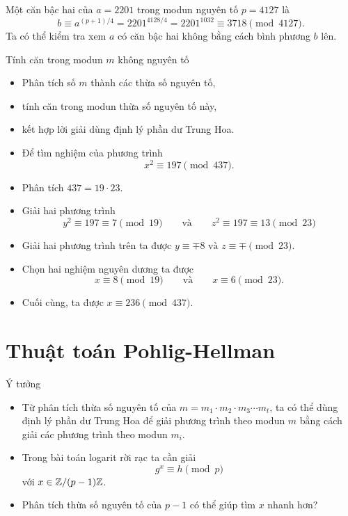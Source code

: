 \begin{frame}
	\begin{xmpl}
		Một căn bậc hai của $a=2201$ trong modun nguyên tố $p = 4127$ là
		\[
			b \equiv a^{(p+1)/4} = 2201^{4128/4} = 2201^{1032} \equiv 3718 \pmod{4127}. 
		\]
		Ta có thể kiểm tra xem $a$ có căn bậc hai không bằng cách bình phương $b$ lên.
	\end{xmpl}
\end{frame}
\begin{frame}{Tính căn trong modun $m$ không nguyên tố}
	\begin{itemize}
		\item<+-> Phân tích số $m$ thành các thừa số nguyên tố,
		\item<+-> tính căn trong modun thừa số nguyên tố này,  
		\item<+-> kết hợp lời giải dùng định lý phần dư Trung Hoa. 
	\end{itemize}
\end{frame}

\begin{frame}
	\begin{xmpl}
		\begin{itemize}
			\item Để  tìm nghiệm của phương trình 
			\[
				x^2 \equiv 197 \pmod{437}.
				\]
			\item Phân tích $437 = 19 \cdot 23$.
			\item<+-> Giải hai phương trình 
			\[
				y^2 \equiv 197 \equiv 7 \pmod{19}\qquad \text{và}\qquad z^2 \equiv 197 \equiv 13 \pmod{23}  
			\] 
			\item<+-> Giải hai phương trình trên ta được $y \equiv \mp 8 \text{ và } z \equiv \mp \pmod{23}.$			 
			\item<+-> Chọn hai nghiệm nguyên dương ta được 
			\[
				x \equiv 8 \pmod{19} \qquad \text{và} \qquad x \equiv 6 \pmod{23}.
			\] 
			\item<+-> Cuối cùng, ta được $x \equiv 236 \pmod{437}$. 
		\end{itemize}
	\end{xmpl}
\end{frame}

\section{Thuật toán Pohlig-Hellman}
\begin{frame}{Ý  tưởng}
	\begin{itemize}
		\item<+-> Từ phân tích thừa số  nguyên tố của $m = m_1 \cdot m_2 \cdot m_3 \cdots m_t$, ta có thể dùng định lý phần dư Trung Hoa để giải phương trình theo modun $m$ bằng cách giải các phương trình theo modun $m_i$. 
		\item<+-> Trong bài toán logarit rời rạc ta cần giải
		\[
			g^x \equiv h \pmod{p}
		\] 
		với $x \in \mathbb{Z}/(p-1)\mathbb{Z}$.
		\item<+-> Phân tích thừa số nguyên tố của $p-1$ có thể giúp tìm $x$ nhanh hơn? 
	\end{itemize}
\end{frame}


